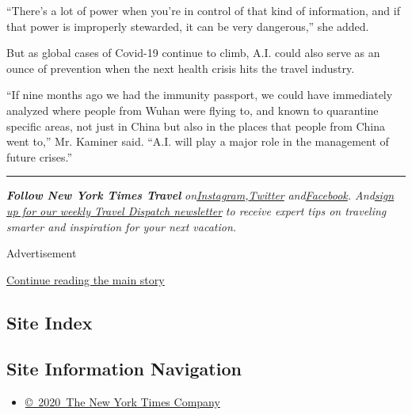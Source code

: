 ``There's a lot of power when you're in control of that kind of
information, and if that power is improperly stewarded, it can be very
dangerous,'' she added.

But as global cases of Covid-19 continue to climb, A.I. could also serve
as an ounce of prevention when the next health crisis hits the travel
industry.

``If nine months ago we had the immunity passport, we could have
immediately analyzed where people from Wuhan were flying to, and known
to quarantine specific areas, not just in China but also in the places
that people from China went to,'' Mr. Kaminer said. ``A.I. will play a
major role in the management of future crises.''

\begin{center}\rule{0.5\linewidth}{\linethickness}\end{center}

\emph{\textbf{Follow New York Times Travel}}
\emph{on}\href{https://www.instagram.com/nytimestravel/}{\emph{Instagram}}\emph{,}\href{https://twitter.com/nytimestravel}{\emph{Twitter}}
\emph{and}\href{https://www.facebookcorewwwi.onion/nytimestravel/}{\emph{Facebook}}\emph{.
And}\href{https://www.nytimes3xbfgragh.onion/newsletters/traveldispatch}{\emph{sign
up for our weekly Travel Dispatch newsletter}} \emph{to receive expert
tips on traveling smarter and inspiration for your next vacation.}

Advertisement

\protect\hyperlink{after-bottom}{Continue reading the main story}

\hypertarget{site-index}{%
\subsection{Site Index}\label{site-index}}

\hypertarget{site-information-navigation}{%
\subsection{Site Information
Navigation}\label{site-information-navigation}}

\begin{itemize}
\tightlist
\item
  \href{https://help.nytimes3xbfgragh.onion/hc/en-us/articles/115014792127-Copyright-notice}{©~2020~The
  New York Times Company}
\end{itemize}

